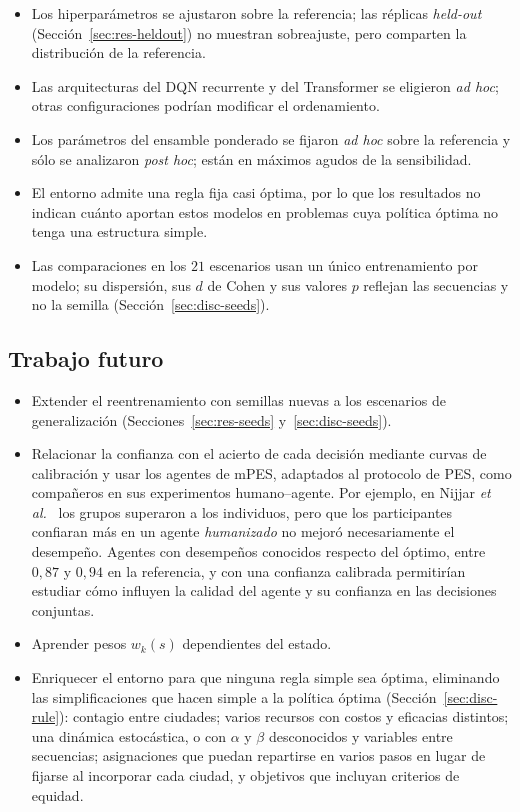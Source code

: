 \documentclass[../00_Main/Main.tex]{subfiles}
\begin{document}
\begin{itemize}
    \item Los hiperpar\'ametros se ajustaron sobre la referencia; las
    r\'eplicas \emph{held-out} (Secci\'on~\ref{sec:res-heldout}) no
    muestran sobreajuste, pero comparten la distribuci\'on de la referencia.
    \item Las arquitecturas del DQN recurrente y del Transformer se
    eligieron \emph{ad hoc}; otras configuraciones podr\'ian modificar el
    ordenamiento.
    \item Los par\'ametros del ensamble ponderado se fijaron \emph{ad hoc} sobre
    la referencia y s\'olo se analizaron \emph{post hoc}; est\'an en
    m\'aximos agudos de la sensibilidad.
    \item El entorno admite una regla fija casi \'optima, por lo que los
    resultados no indican cu\'anto aportan estos modelos en problemas
    cuya pol\'itica \'optima no tenga una estructura simple.
    \item Las comparaciones en los $21$ escenarios usan un \'unico
    entrenamiento por modelo; su dispersi\'on, sus $d$ de Cohen y sus
    valores $p$ reflejan las secuencias y no la semilla
    (Secci\'on~\ref{sec:disc-seeds}).
\end{itemize}

\subsection{Trabajo futuro}\label{sec:future}

\begin{itemize}
    \item Extender el reentrenamiento con semillas nuevas a los
    escenarios de generalizaci\'on (Secciones~\ref{sec:res-seeds}
    y~\ref{sec:disc-seeds}).
    \item Relacionar la confianza con el acierto de cada decisi\'on
    mediante curvas de calibraci\'on y usar los agentes de mPES, adaptados
    al protocolo de PES, como compa\~neros en sus experimentos
    humano--agente. Por ejemplo, en Nijjar \emph{et al.}~\citep{Nijjar2025}
    los grupos superaron a
    los individuos, pero que los participantes confiaran m\'as en un
    agente \emph{humanizado} no mejor\'o necesariamente el desempe\~no.
    Agentes con desempe\~nos conocidos respecto del \'optimo, entre
    $0{,}87$ y $0{,}94$ en la referencia, y con una confianza calibrada
    permitir\'ian estudiar c\'omo influyen la calidad del agente y su
    confianza en las decisiones conjuntas.
    \item Aprender pesos $w_k(s)$ dependientes del estado.
    \item Enriquecer el entorno para que ninguna regla simple sea
    \'optima, eliminando las simplificaciones que hacen simple a la
    pol\'itica \'optima (Secci\'on~\ref{sec:disc-rule}): contagio entre
    ciudades; varios recursos con costos y eficacias distintos; una
    din\'amica estoc\'astica, o con $\alpha$ y $\beta$ desconocidos y
    variables entre secuencias; asignaciones que puedan repartirse en
    varios pasos en lugar de fijarse al incorporar cada ciudad, y
    objetivos que incluyan criterios de equidad.
\end{itemize}
\end{document}
